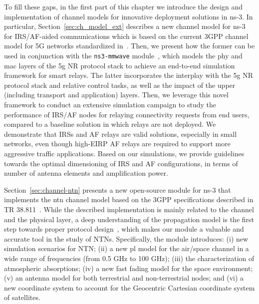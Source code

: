To fill these gaps, in the first part of this chapter we introduce the design and implementation of channel models for innovative deployment solutions in ns-3. 
In particular, Section~\ref{sec:ch_model_ext} describes a new channel model for ns-3 for IRS/AF-aided communications which is based on the current 3GPP channel model for 5G networks standardized in~\cite{3gpp.38.901}. 
Then, we present how the former can be used in conjunction with the \texttt{ns3-mmwave} module~\cite{mezzavilla2018end}, which models the \gls{phy} and \gls{mac} layers of the \gls{5g} NR protocol stack to achieve an end-to-end simulation framework for smart relays. The latter incorporates the interplay with the \gls{5g} NR protocol stack and relative control tasks, as well as the impact of the upper (including transport and application) layers. Then, we leverage this novel framework to conduct an extensive simulation campaign to study the performance of IRS/AF nodes for relaying connectivity requests from end users, compared to a baseline solution in which relays are not deployed. We demonstrate that IRSs and AF relays are valid solutions, especially in small networks, even though high-EIRP AF relays are required to support more aggressive traffic applications. Based on our simulations, we provide guidelines towards the optimal dimensioning of IRS and AF configurations, in terms of number of antenna elements and amplification power.

Section~\ref{sec:channel-ntn} presents a new open-source module for ns-3 that implements the \gls{ntn} channel model based on the 3GPP specifications described in TR 38.811~\cite{38811}.
While the described implementation is mainly related to the channel and the physical layer, a deep understanding of the propagation model is the first step towards proper protocol design~\cite{lecci2021accuracy}, which makes our module a valuable and accurate tool in the study of NTNs.
Specifically, the module introduces: (i) new simulation scenarios for NTN; (ii) a new \gls{pl} model for the air/space channel in a wide range of frequencies (from 0.5 GHz to 100 GHz); (iii) the characterization of atmospheric absorptions; (iv) a new fast fading model for the space environment; (v) an antenna model for both terrestrial and non-terrestrial nodes; and (vi) a new coordinate system to account for the Geocentric Cartesian coordinate system of satellites. 

